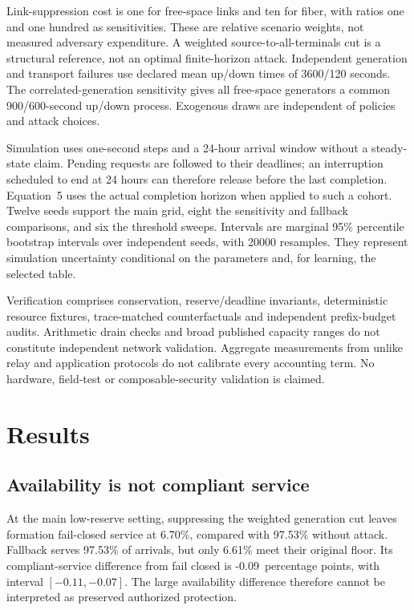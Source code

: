 \documentclass[conference,a4paper]{IEEEtran}
\newcommand{\MainClosed}{6.70}
\newcommand{\MainDegraded}{97.53}
\newcommand{\MainQualified}{6.61}
\newcommand{\MainNoAttack}{97.53}
\newcommand{\MainQualifiedDelta}{-0.09}
\newcommand{\MainQualifiedDeltaLo}{-0.11}
\newcommand{\MainQualifiedDeltaHi}{-0.07}
\begin{document}
Link-suppression cost is one for free-space links and ten for fiber, with ratios one and one hundred as sensitivities. These are relative scenario weights, not measured adversary expenditure. A weighted source-to-all-terminals cut is a structural reference, not an optimal finite-horizon attack. Independent generation and transport failures use declared mean up/down times of 3600/120 seconds. The correlated-generation sensitivity gives all free-space generators a common 900/600-second up/down process. Exogenous draws are independent of policies and attack choices.

Simulation uses one-second steps and a 24-hour arrival window without a steady-state claim. Pending requests are followed to their deadlines; an interruption scheduled to end at 24 hours can therefore release before the last completion. Equation~5 uses the actual completion horizon when applied to such a cohort. Twelve seeds support the main grid, eight the sensitivity and fallback comparisons, and six the threshold sweeps. Intervals are marginal 95\% percentile bootstrap intervals over independent seeds, with 20000 resamples. They represent simulation uncertainty conditional on the parameters and, for learning, the selected table.

Verification comprises conservation, reserve/deadline invariants, deterministic resource fixtures, trace-matched counterfactuals and independent prefix-budget audits. Arithmetic drain checks and broad published capacity ranges do not constitute independent network validation. Aggregate measurements from unlike relay and application protocols do not calibrate every accounting term. No hardware, field-test or composable-security validation is claimed.

\section{Results}\label{sec:results}
\subsection{Availability is not compliant service}
At the main low-reserve setting, suppressing the weighted generation cut leaves formation fail-closed service at \MainClosed\%, compared with \MainNoAttack\% without attack. Fallback serves \MainDegraded\% of arrivals, but only \MainQualified\% meet their original floor. Its compliant-service difference from fail closed is \MainQualifiedDelta\ percentage points, with interval $[\MainQualifiedDeltaLo,\MainQualifiedDeltaHi]$. The large availability difference therefore cannot be interpreted as preserved authorized protection.
\end{document}
